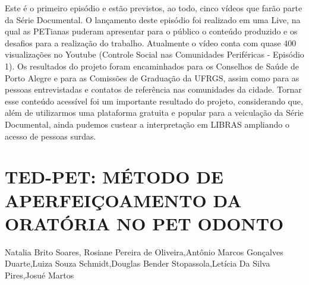 Este é o primeiro episódio e estão previstos, ao todo, cinco vídeos que farão parte da Série Documental. O lançamento deste episódio foi realizado em uma Live, na qual as PETianas puderam apresentar para o público o conteúdo produzido e os desafios para a realização do trabalho. Atualmente o vídeo conta com quase 400 visualizações no Youtube (Controle Social nas Comunidades Periféricas -   Episódio 1). Os resultados do projeto foram encaminhados para os Conselhos de Saúde de Porto Alegre e para as Comissões de Graduação da UFRGS, assim como para as pessoas entrevistadas e contatos de referência nas comunidades da cidade. Tornar esse conteúdo acessível foi um importante resultado do projeto, considerando que, além de utilizarmos uma plataforma gratuita e popular para a veiculação da Série Documental, ainda pudemos custear a interpretação em LIBRAS ampliando o acesso de pessoas surdas.




\section{TED-PET: MÉTODO DE APERFEIÇOAMENTO DA ORATÓRIA NO PET ODONTO}

Natalia Brito Soares, Rosiane Pereira de Oliveira,Antônio Marcos Gonçalves Duarte,Luiza Souza  Schmidt,Douglas Bender Stopassola,Letícia Da Silva Pires,Josué Martos

